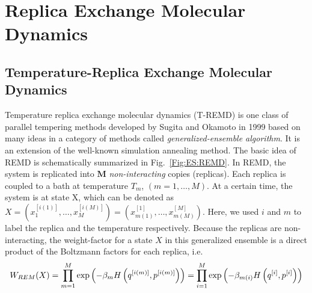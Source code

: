 \section{Replica Exchange Molecular Dynamics\label{Sec:ES:REMD}}
\subsection{Temperature-Replica Exchange Molecular Dynamics}
Temperature replica exchange molecular dynamics (T-REMD) is one class of parallel tempering methods developed by Sugita and Okamoto in 1999\cite{SugitaCPL1999} based on many ideas in a category of methods called \textit{generalized-ensemble algorithm}. It is an extension of the well-known simulation annealing method. The basic idea of REMD is schematically summarized in Fig.~\ref{Fig:ES:REMD}. In REMD, the system is replicated into $\mathbf{M}$ \textit{non-interacting} copies (replicas). Each replica is coupled to a bath at temperature $T_m$, $(m=1,\dots,M)$. At a certain time, the system is at state X, which can be denoted as $X=\left(x_1^{[i(1)]},\dots,x_M^{[i(M)]}\right)=\left(x_{m(1)}^{[1]},\dots,x_{m(M)}^{[M]}\right)$. Here, we used $i$ and $m$ to label the replica and the temperature respectively. Because the replicas are non-interacting, the weight-factor for a state $X$ in this generalized ensemble is a direct product of the Boltzmann factors for each replica, i.e.
\begin{equation}
	W_{REM}(X)=\prod\limits_{m=1}^M\exp{\left(-\beta_m H\left(q^{[i(m)]},p^{[i(m)]}\right)\right)}=\prod\limits_{i=1}^M \exp{\left(-\beta_{m(i)}H\left(q^{[i]},p^{[i]}\right)\right)}\textsl{}
\end{equation}

